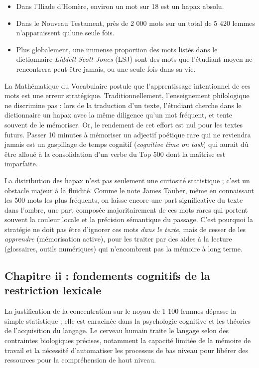 {\begin{itemize}\item Dans l'Iliade d'Homère, environ un mot sur 18 est un hapax absolu.\cite{III-1-1-ref15}\item Dans le Nouveau Testament, près de 2 000 mots sur un total de 5 420 lemmes n'apparaissent qu'une seule fois.\cite{III-1-1-ref16}\item Plus globalement, une immense proportion des mots listés dans le dictionnaire \textit{Liddell-Scott-Jones} (LSJ) sont des mots que l'étudiant moyen ne rencontrera peut-être jamais, ou une seule fois dans sa vie.\end{itemize}La \og Mathématique du Vocabulaire\fg{} postule que l'apprentissage intentionnel de ces mots est une
erreur stratégique. Traditionnellement, l'enseignement philologique ne discrimine pas : lors de la
traduction d'un texte, l'étudiant cherche dans le dictionnaire un hapax avec la même diligence qu'un
mot fréquent, et tente souvent de le mémoriser. Or, le \og rendement\fg{} de cet effort est nul pour
les textes futurs. Passer 10 minutes à mémoriser un adjectif poétique rare qui ne reviendra jamais
est un gaspillage de temps cognitif (\textit{cognitive time on task}) qui aurait dû être alloué à la
consolidation d'un verbe du Top 500 dont la maîtrise est imparfaite.\cite{III-1-1-ref16}

La distribution des hapax n'est pas seulement une curiosité statistique ; c'est un obstacle majeur à
la fluidité. Comme le note James Tauber, même en connaissant les 500 mots les plus fréquents, on
laisse encore une part significative du texte dans l'ombre, une part composée majoritairement de ces
mots rares qui portent souvent la couleur locale et la précision sémantique du
passage.\cite{III-1-1-ref17} C'est pourquoi la stratégie ne doit pas être d'ignorer ces mots
\textit{dans le texte}, mais de cesser de les \textit{apprendre} (mémorisation active), pour les
traiter par des aides à la lecture (glossaires, outils numériques) qui n'encombrent pas la mémoire à
long terme.



\subsection{Chapitre ii : fondements cognitifs de la restriction lexicale}

La justification de la concentration sur le noyau de 1 100 lemmes dépasse la simple statistique ;
elle est enracinée dans la psychologie cognitive et les théories de l'acquisition du langage. Le
cerveau humain traite le langage selon des contraintes biologiques précises, notamment la capacité
limitée de la mémoire de travail et la nécessité d'automatiser les processus de bas niveau pour
libérer des ressources pour la compréhension de haut niveau.



}
